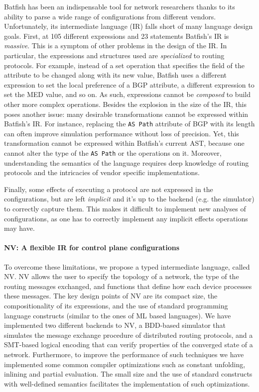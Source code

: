 \documentclass[sigconf,10pt]{acmart}
\begin{document}
Batfish has been an indispensable tool for network researchers thanks
to its ability to parse a wide range of configurations from different
vendors. Unfortunately, its intermediate language (IR) falls short of
many language design goals. First, at 105 different expressions and 23
statements Batfish's IR is \emph{massive}. This is a symptom of other
problems in the design of the IR. In particular, the expressions and
structures used are \emph{specialized} to routing protocols. For
example, instead of a set operation that specifies the field of the
attribute to be changed along with its new value, Batfish uses a
different expression to set the local preference of a BGP attribute, a
different expression to set the MED value, and so on. As such,
expressions cannot be \emph{composed} to build other more complex
operations. Besides the explosion in the size of the IR, this poses
another issue: many desirable transformations cannot be expressed
within Batfish's IR. For instance, replacing the \texttt{AS Path}
attribute of BGP with its length can often improve simulation
performance without loss of precision. Yet, this transformation cannot
be expressed within Batfish's current AST, because one cannot alter
the type of the \texttt{AS Path} or the operations on it. Moreover,
understanding the semantics of the language requires deep knowledge of
routing protocols and the intricacies of vendor specific implementations.

Finally, some effects of executing a protocol are not expressed in the
configurations, but are left \emph{implicit} and it's up to the
backend (e.g. the simulator) to correctly capture
them. This makes it difficult to implement new analyses of
configurations, as one has to correctly implement any implicit effects
operations may have.

\paragraph{NV: A flexible IR for control plane configurations}

To overcome these limitations, we propose a typed intermediate
language, called NV. NV allows the user to specify the topology of a
network, the type of the routing messages exchanged, and functions
that define how each device processes these messages. The key design
points of NV are its compact size, the compositionality of its
expressions, and the use of standard programming language constructs
(similar to the ones of ML based languages). We have implemented two
different backends to NV, a BDD-based simulator that simulates the
message exchange procedure of distributed routing protocols, and a
SMT-based logical encoding that can verify properties of the
converged state of a network. Furthermore, to improve the
performance of such techniques we have implemented some common
compiler optimizations such as constant unfolding, inlining and
partial evaluation. The small size and the use of standard constructs
with well-defined semantics facilitates the
implementation of such optimizations.
\end{document}
